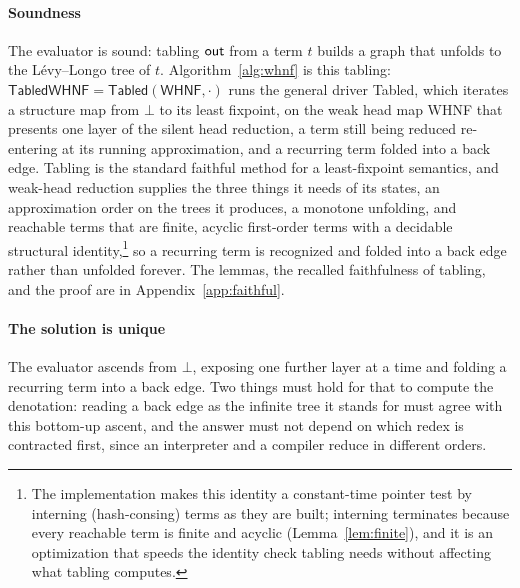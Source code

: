 \paragraph{Soundness}
The evaluator is sound: tabling $\mathsf{out}$ from a term $t$ builds a graph that unfolds to the L\'evy--Longo tree of $t$. Algorithm~\ref{alg:whnf} is this tabling: $\textsf{TabledWHNF} = \textsf{Tabled}(\textsf{WHNF}, \cdot)$ runs the general driver \textsf{Tabled}, which iterates a structure map from $\bot$ to its least fixpoint, on the weak head map \textsf{WHNF} that presents one layer of the silent head reduction, a term still being reduced re-entering at its running approximation, and a recurring term folded into a back edge. Tabling is the standard faithful method for a least-fixpoint semantics, and weak-head reduction supplies the three things it needs of its states, an approximation order on the trees it produces, a monotone unfolding, and reachable terms that are finite, acyclic first-order terms with a decidable structural identity,\footnote{The implementation makes this identity a constant-time pointer test by interning (hash-consing) terms as they are built; interning terminates because every reachable term is finite and acyclic (Lemma~\ref{lem:finite}), and it is an optimization that speeds the identity check tabling needs without affecting what tabling computes.} so a recurring term is recognized and folded into a back edge rather than unfolded forever. The lemmas, the recalled faithfulness of tabling, and the proof are in Appendix~\ref{app:faithful}.

\paragraph{The solution is unique}
The evaluator ascends from $\bot$, exposing one further layer at a time and folding a recurring term into a back edge. Two things must hold for that to compute the denotation: reading a back edge as the infinite tree it stands for must agree with this bottom-up ascent, and the answer must not depend on which redex is contracted first, since an interpreter and a compiler reduce in different orders.


